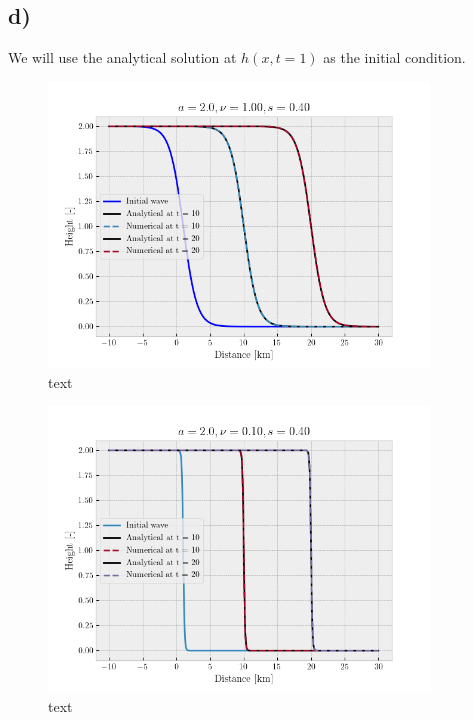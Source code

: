 \documentclass[10pt, a4paper]{amsart}
\begin{document}
\subsection{d)}
We will use the analytical solution at $h(x,t=1)$ as the initial condition. 
\begin{figure}
	\centering
	\includegraphics[width=0.9\textwidth]{../code/fig1.png}
	\caption{text}
	\label{key4}
\end{figure}
\begin{figure}
	\centering
	\includegraphics[width=0.9\textwidth]{../code/fig2.png}
	\caption{text}
	\label{key5}
\end{figure}
\end{document}
